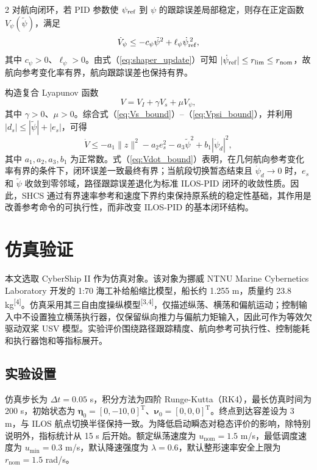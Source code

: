 \documentclass[authordraft]{ctacn}
\begin{document}
\begin{multicols}{2}
对航向闭环，若 PID 参数使 $\psi_{\rm ref}$ 到 $\psi$ 的跟踪误差局部稳定，则存在正定函数 $V_\psi(\tilde\psi)$，满足
\begin{equation}
\dot V_\psi \leq -c_\psi \tilde\psi^2+\ell_\psi \dot\psi_{\rm ref}^{\,2},
\label{eq:Vpsi_bound}
\end{equation}
其中 $c_\psi>0$、$\ell_\psi>0$。由式（\ref{eq:shaper_update}）可知 $|\dot\psi_{\rm ref}|\leq r_{\lim}\leq r_{\rm nom}$，故航向参考变化率有界，航向跟踪误差也保持有界。

构造复合 Lyapunov 函数
\begin{equation}
V=V_I+\gamma V_s+\mu V_\psi ,
\label{eq:V_composite}
\end{equation}
其中 $\gamma>0$、$\mu>0$。综合式（\ref{eq:Vs_bound}）--（\ref{eq:Vpsi_bound}），并利用 $|d_s|\leq |\tilde\psi|+|e_s|$，可得
\begin{equation}
\dot V\leq -a_1\|z\|^2-a_2 e_s^2-a_3\tilde\psi^2+b_1|\dot\psi_d|^2,
\label{eq:Vdot_bound}
\end{equation}
其中 $a_1,a_2,a_3,b_1$ 为正常数。式（\ref{eq:Vdot_bound}）表明，在几何航向参考变化率有界的条件下，闭环误差一致最终有界；当航段切换暂态结束且 $\dot\psi_d\to0$ 时，$e_s$ 和 $\tilde\psi$ 收敛到零邻域，路径跟踪误差退化为标准 ILOS-PID 闭环的收敛性质。因此，SHCS 通过有界速率参考和速度下界约束保持原系统的稳定性基础，其作用是改善参考命令的可执行性，而非改变 ILOS-PID 的基本闭环结构。

\section{仿真验证}
本文选取 CyberShip II 作为仿真对象。该对象为挪威 NTNU Marine Cybernetics Laboratory 开发的 1:70 海工补给船缩比模型，船长约 1.255 m，质量约 23.8 kg\textsuperscript{[4]}。仿真采用其三自由度操纵模型\textsuperscript{[3,4]}，仅描述纵荡、横荡和偏航运动；控制输入中不设置独立横荡执行器，仅保留纵向推力与偏航力矩输入，因此可作为等效欠驱动双桨 USV 模型。实验评价围绕路径跟踪精度、航向参考可执行性、控制能耗和执行器饱和等指标展开。

\subsection{实验设置}

仿真步长为 $\Delta t=0.05$ s，积分方法为四阶 Runge-Kutta（RK4），最长仿真时间为 200 s，初始状态为 $\boldsymbol{\eta}_0=[0,-10,0]^{\mathrm T}$、$\boldsymbol{\nu}_0=[0,0,0]^{\mathrm T}$。终点到达容差设为 3 m，与 ILOS 航点切换半径保持一致。为降低启动瞬态对稳态评价的影响，除特别说明外，指标统计从 15 s 后开始。额定纵荡速度为 $u_{\mathrm{nom}}=1.5$ m/s，最低调度速度为 $u_{\min}=0.3$ m/s，默认降速强度为 $\lambda=0.6$，默认整形速率安全上限为 $r_{\mathrm{nom}}=1.5$ rad/s。


\end{multicols}
\end{document}
